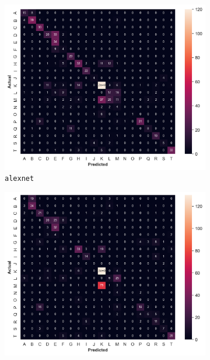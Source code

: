 \documentclass[a4paper]{article}
\begin{document}
  \begin{figure}[b]
    \centering
    \begin{subfigure}{.33\textwidth}
        \centering
        \includegraphics[width=\textwidth]
        {figures/experiment1-conf-matrix-alexnet.png}
        \caption{\texttt{alexnet}}
    \end{subfigure}%
    \begin{subfigure}{.33\textwidth}
        \centering
        \includegraphics[width=\textwidth]
        {figures/experiment1-conf-matrix-alexnet-rnn.png}

\end{subfigure}
\end{figure}
\end{document}
